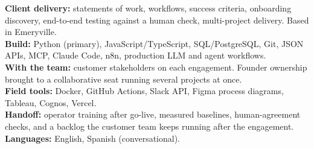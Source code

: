 \documentclass[10pt,letterpaper]{article}
\begin{document}
\noindent\textbf{Client delivery:} statements of work, workflows, success criteria, onboarding discovery, end-to-end testing against a human check, multi-project delivery. Based in Emeryville.\\[2pt]
\noindent\textbf{Build:} Python (primary), JavaScript/TypeScript, SQL/PostgreSQL, Git, JSON APIs, MCP, Claude Code, n8n, production LLM and agent workflows.\\[2pt]
\noindent\textbf{With the team:} customer stakeholders on each engagement. Founder ownership brought to a collaborative seat running several projects at once.\\[2pt]
\noindent\textbf{Field tools:} Docker, GitHub Actions, Slack API, Figma process diagrams, Tableau, Cognos, Vercel.\\[2pt]
\noindent\textbf{Handoff:} operator training after go-live, measured baselines, human-agreement checks, and a backlog the customer team keeps running after the engagement.\\[2pt]
\noindent\textbf{Languages:} English, Spanish (conversational).
\end{document}

